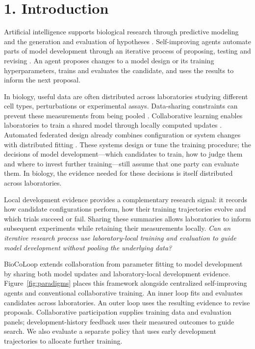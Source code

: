 \section*{1. Introduction}
Artificial intelligence supports biological research through predictive modeling and the generation and evaluation of hypotheses \citep{Cui2024scGPT,Theodoris2023Geneformer,Roohani2024BioDiscoveryAgent}. Self-improving agents automate parts of model development \citep{Jiang2025AIDE,Lu2024AIScientist,Zhou2026DrugEvolve} through an iterative process of proposing, testing and revising \citep{Madaan2023SelfRefine,Shinn2023Reflexion,Huang2023MLAgentBench}. An agent proposes changes to a model design or its training hyperparameters, trains and evaluates the candidate, and uses the results to inform the next proposal.

In biology, useful data are often distributed across laboratories studying different cell types, perturbations or experimental assays. Data-sharing constraints can prevent these measurements from being pooled \citep{Sheller2020,Bakhtiari2025FedscGen,Dayan2021FederatedCOVID,Kaissis2020PrivacyPreserving,Rieke2020DigitalHealth}. Collaborative learning enables laboratories to train a shared model through locally computed updates \citep{McMahan2017,Wang2024scFed,Li2020FedProx,Karimireddy2020SCAFFOLD,Kairouz2021Advances}. Automated federated design already combines configuration or system changes with distributed fitting \citep{Khodak2021FedEx,Li2025Helmsman}. These systems design or tune the training procedure; the decisions of model development---which candidates to train, how to judge them and where to invest further training---still assume that one party can evaluate them. In biology, the evidence needed for these decisions is itself distributed across laboratories.

Local development evidence provides a complementary research signal: it records how candidate configurations perform, how their training trajectories evolve and which trials succeed or fail. Sharing these summaries allows laboratories to inform subsequent experiments while retaining their measurements locally. \textit{Can an iterative research process use laboratory-local training and evaluation to guide model development without pooling the underlying data?}

BioCoLoop extends collaboration from parameter fitting to model development by sharing both model updates and laboratory-local development evidence. Figure~\ref{fig:paradigms} places this framework alongside centralized self-improving agents and conventional collaborative training. An inner loop fits and evaluates candidates across laboratories. An outer loop uses the resulting evidence to revise proposals. Collaborative participation supplies training data and evaluation panels; development-history feedback uses their measured outcomes to guide search. We also evaluate a separate policy that uses early development trajectories to allocate further training.

